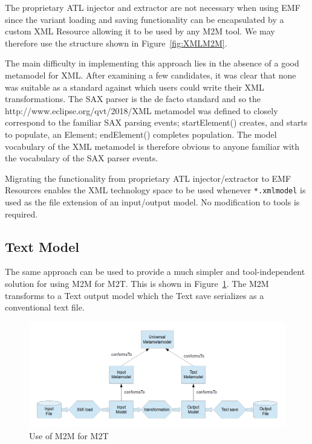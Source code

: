 \documentclass{llncs}
\begin{document}
The proprietary ATL injector and extractor are not necessary when using EMF since the variant loading and saving functionality can be encapsulated by a custom XML Resource allowing it to be used by any M2M tool. We may therefore use the structure shown in Figure~\ref{fig:XMLM2M}.

The main difficulty in implementing this approach lies in the absence of a good metamodel for XML. After examining a few candidates, it was clear that none was suitable as a standard against which users could write their XML transformations. The SAX parser \cite{SAXparser} is the de facto standard and so the http://www.eclipse.org/qvt/2018/XML metamodel was defined to closely correspond to the familiar SAX parsing events; startElement() creates, and starts to populate, an Element; endElement() completes population. The model vocabulary of the XML metamodel is therefore obvious to anyone familiar with the vocabulary of the SAX parser events.

Migrating the functionality from proprietary ATL injector/extractor to EMF Resources enables the XML technology space to be used whenever \verb$*.xmlmodel$ is used as the file extension of an input/output model. No modification to tools is required. %

\subsection{Text Model}\label{Text Model}

The same approach can be used to provide a much simpler and tool-independent solution for using M2M for M2T. This is shown in Figure~\ref{fig:TextM2M}. The M2M transforms to a Text output model which the Text save serializes as a conventional text file.

\begin{figure}
	\begin{center}
		\includegraphics[width=4.9in]{TextM2M.png}
	\end{center}
	\caption{Use of M2M for M2T}
	\label{fig:TextM2M}
\end{figure}
\end{document}
